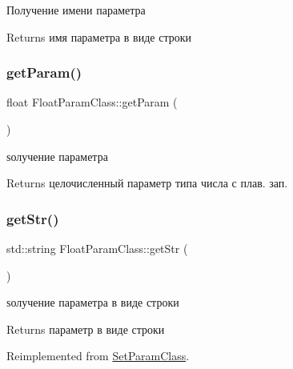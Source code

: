Получение имени параметра 

\begin{DoxyReturn}{Returns}
имя параметра в виде строки 
\end{DoxyReturn}
\mbox{\label{class_float_param_class_ac2802942074ac215b14ade0955f7c2df}} 
\subsubsection{\texorpdfstring{get\+Param()}{getParam()}}
{\footnotesize\ttfamily float Float\+Param\+Class\+::get\+Param (\begin{DoxyParamCaption}{ }\end{DoxyParamCaption})}



ѕолучение параметра 

\begin{DoxyReturn}{Returns}
целочисленный параметр типа числа с плав. зап. 
\end{DoxyReturn}
\mbox{\label{class_float_param_class_abe97aa2885386ef60127abe9ca0df8a4}} 
\subsubsection{\texorpdfstring{get\+Str()}{getStr()}}
{\footnotesize\ttfamily std\+::string Float\+Param\+Class\+::get\+Str (\begin{DoxyParamCaption}{ }\end{DoxyParamCaption})\hspace{0.3cm}{\ttfamily [virtual]}}



ѕолучение параметра в виде строки 

\begin{DoxyReturn}{Returns}
параметр в виде строки 
\end{DoxyReturn}


Reimplemented from \hyperlink{class_set_param_class_a44f3924827807beb6805867a0305e8c9}{Set\+Param\+Class}.

\mbox{\label{class_set_param_class_aeabf85ad5a078ab4abb8f09a67f2c8e0}} 
